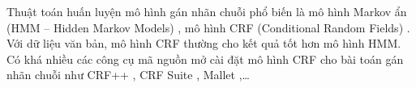 \begin{table}[]
\begin{center}
    \caption{Gán nhãn từ theo mô hình B-I-O trong trích xuất thông tin}
    \label{fig:model-BIO}
    \end{center}
\end{table}

Thuật toán huấn luyện mô hình gán nhãn chuỗi phổ biến là mô hình Markov ẩn (HMM – Hidden Markov Models) \cite{2}, mô hình CRF (Conditional Random Fields) \cite{3}. Với dữ liệu văn bản, mô hình CRF thường cho kết quả tốt hơn mô hình HMM. Có khá nhiều các công cụ mã nguồn mở cài đặt mô hình CRF cho bài toán gán nhãn chuỗi như CRF++ \cite{4}, CRF Suite \cite{5}, Mallet \cite{6},…


